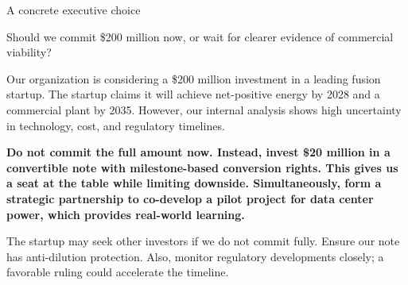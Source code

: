 \documentclass[10pt,a4paper]{article}
\begin{document}
\clearpage
{\sffamily\fontsize{22}{27}\selectfont\color{BONavy} A concrete executive choice}\par\vspace{10pt}
\begin{minipage}[t]{0.43\linewidth}
{\sffamily\fontsize{17}{22}\selectfont\color{BOGreen} Should we commit \$200 million now, or wait for clearer evidence of commercial viability?}\par
\end{minipage}\hfill\begin{minipage}[t]{0.50\linewidth}
{\small Our organization is considering a \$200 million investment in a leading fusion startup. The startup claims it will achieve net-positive energy by 2028 and a commercial plant by 2035. However, our internal analysis shows high uncertainty in technology, cost, and regulatory timelines.}\par
{\small\bfseries\color{BOText} Do not commit the full amount now. Instead, invest \$20 million in a convertible note with milestone-based conversion rights. This gives us a seat at the table while limiting downside. Simultaneously, form a strategic partnership to co-develop a pilot project for data center power, which provides real-world learning.}\par\vspace{5pt}
{\footnotesize\color{BOMuted} The startup may seek other investors if we do not commit fully. Ensure our note has anti-dilution protection. Also, monitor regulatory developments closely; a favorable ruling could accelerate the timeline.}\par\end{minipage}
\end{document}
